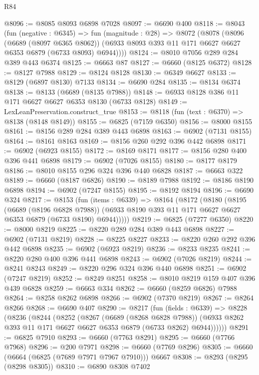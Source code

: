 \begin{lexlean}{R84}
\begin{coremodule}
@8096 := @8085 @8093 @6898 @7028
@8097 := @6690 @400
@8118 := @8043
    (fun (negative : @6345) =>
    fun (magnitude : @28) =>
    @8072
      (@8078
        (@8096
          (@6689 (@8097 @6365 @8062))
          (@6933 @8093 @393 @11 @171 @6627 @6627 @6353 @6879 (@6733 @8093) @6944))))
@8124 := @8010 @7056 @289 @284 @389 @443 @6374
@8125 := @6663 @87
@8127 := @6660 (@8125 @6372)
@8128 := @8127 @7988
@8129 := @8124 @8128
@8130 := @6349 @6627
@8133 := @8129 (@6897 @8130) @7133
@8134 := @6690 @284
@8135 := @8134 @6374
@8138 := @8133 (@6689 (@8135 @7988))
@8148 := @6933 @8128 @386 @11 @171 @6627 @6627 @6353 @8130 (@6733 @8128)
@8149 := LexLeanPreservation.construct_true
@8153 := @8118 (fun (text : @6370) => @8138 (@8148 @8149))
@8155 := @6825 (@7159 @6350)
@8156 := @8000 @8155
@8161 := @8156 @289 @284 @389 @443 @6898
@8163 := @6902 (@7131 @8155)
@8164 := @8161 @8163
@8169 := @8156 @260 @292 @396 @442 @6898
@8171 := @6902 (@6923 @8155)
@8172 := @8169 @8171
@8177 := @8156 @280 @400 @396 @441 @6898
@8179 := @6902 (@7026 @8155)
@8180 := @8177 @8179
@8186 := @8010 @8155 @296 @324 @396 @440 @6828
@8187 := @6663 @322
@8189 := @6660 (@8187 @6826)
@8190 := @8189 @7988
@8192 := @8186 @8190 @6898
@8194 := @6902 (@7247 @8155)
@8195 := @8192 @8194
@8196 := @6690 @324
@8217 := @8153
    (fun (items : @6339) =>
    @8164
      (@8172
        (@8180
          (@8195
            (@6689 (@8196 @6828 @7988))
            (@6933 @8190 @393 @11 @171 @6627 @6627 @6353 @6879 (@6733 @8190) @6944)))))
@8219 := @6825 (@7277 @6350)
@8220 := @8000 @8219
@8225 := @8220 @289 @284 @389 @443 @6898
@8227 := @6902 (@7131 @8219)
@8228 := @8225 @8227
@8233 := @8220 @260 @292 @396 @442 @6898
@8235 := @6902 (@6923 @8219)
@8236 := @8233 @8235
@8241 := @8220 @280 @400 @396 @441 @6898
@8243 := @6902 (@7026 @8219)
@8244 := @8241 @8243
@8249 := @8220 @296 @324 @396 @440 @6898
@8251 := @6902 (@7247 @8219)
@8252 := @8249 @8251
@8258 := @8010 @8219 @159 @407 @396 @439 @6828
@8259 := @6663 @334
@8262 := @6660 (@8259 @6826) @7988
@8264 := @8258 @8262 @6898
@8266 := @6902 (@7370 @8219)
@8267 := @8264 @8266
@8268 := @6690 @407
@8290 := @8217
    (fun (fields : @6339) =>
    @8228
      (@8236
        (@8244
          (@8252
            (@8267
              (@6689 (@8268 @6828 @7988))
              (@6933 @8262 @393 @11 @171 @6627 @6627 @6353 @6879 (@6733 @8262) @6944))))))
@8291 := @6825 @7910
@8293 := @6660 (@7763 @8291)
@8295 := @6660 (@7766 @7968)
@8296 := @200 @7971
@8298 := @6660 (@7769 @8296)
@8305 := @6660 (@6664 (@6825 (@7689 @7971 @7967 @7910))) @6667
@8308 := @8293 (@8295 (@8298 @8305))
@8310 := @6890 @8308 @7402

\end{coremodule}
\end{lexlean}
